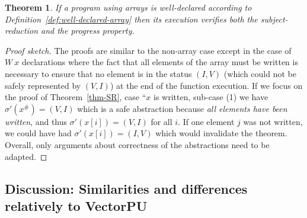 \documentclass[preprint,12pt]{elsarticle}
\newtheorem{Theorem}{Theorem}
\newcommand{\abs}[1]{#1^\#}
\begin{document}
%
%
\begin{Theorem}\label{thm-correct-array}
If a program using arrays is well-declared according to Definition~\ref{def:well-declared-array} then its execution verifies both the subject-reduction and the progress property.
\end{Theorem}
\begin{proof}[Proof sketch]
 The proofs are similar to the non-array case except in the case of $W~x$ 
declarations where the fact that all elements of the array must be written is necessary 
to ensure that no element is in the status $(I,V)$ (which could not be safely represented 
by $(V,I)$) at the end of the function execution. If we focus on the proof of 
Theorem~\ref{thm-SR}, case ``$x$ is written, sub-case (1) we have $\sigma'(\abs x)=(V,I)$ 
which is a safe abstraction because \emph{all elements have been written}, and thus 
$\sigma'(x[i])=(V,I)$ for all $i$. If one element $j$ was not written, we could have had 
$\sigma'(x[i])=(I,V)$ which would invalidate the theorem. Overall, only arguments about correctness of the abstractions need to be adapted.
\end{proof}

\subsection{Discussion: Similarities and differences relatively to VectorPU}
\end{document}
